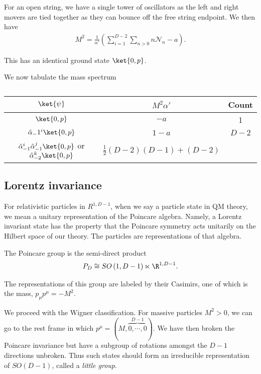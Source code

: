 For an open string, we have a single tower of oscillators as the left and right movers are tied together as they can bounce off the free string endpoint. We then have
\begin{align}
    M^2 = \frac{1}{\alpha'} \left( \sum_{i=1}^{D-2}  \sum_{n>0}^{} n \mathcal{N}_n - a \right) 
.\end{align}

This has an identical ground state $\ket{0,p}$.

We now tabulate the mass spectrum

\begin{table}[h]
    \centering
    \caption{}
    \label{tab:r}
    \begin{tabular}{c|cc}
    $\ket{\psi}$ & $M^2 \alpha'$ &  Count \\
    \midrule
    $\ket{0, p}$ & $-a$ & 1 \\
    $\hat{\alpha}_-1^{i} \ket{0, p}$ & $1 - a$ & $D - 2$ \\
    $\hat{\alpha}_{-1}^{i} \hat{\alpha}^{j}_{-1} \ket{0, p}$ or $\hat{\alpha}_{-2}^{k} \ket{0,p}$ & $\frac{1}{2} \left( D - 2 \right) \left( D - 1 \right) + \left( D - 2 \right) $
    \end{tabular}
\end{table}

\subsection{Lorentz invariance}

For relativistic particles in $R^{1, D - 1}$, when we say a particle state in QM theory, we mean a unitary representation of the Poincare algebra. Namely, a Lorentz invariant state has the property that the Poincare symmetry acts unitarily on the Hilbert space of our theory. The particles are representations of that algebra.

The Poincare group is the semi-direct product
\begin{align}
    P_D \cong SO \left( 1, D - 1 \right) \ltimes \R^{1, D - 1}
.\end{align}

The representations of this group are labeled by their Casimirs, one of which is the mass, $p_\mu p^{\mu} = - M^2$. 

We proceed with the Wigner classification. For massive particles $M^2 > 0$, we can go to the rest frame in which $p^{\mu} = \left( M, \overbrace{0,\cdots,0}^{D-1} \right) $. We have then broken the Poincare invariance but have a subgroup of rotations amongst the $D - 1$ directions unbroken. Thus  such states should form an irreducible representation of $SO \left( D - 1 \right) $, called a \emph{little group}.

